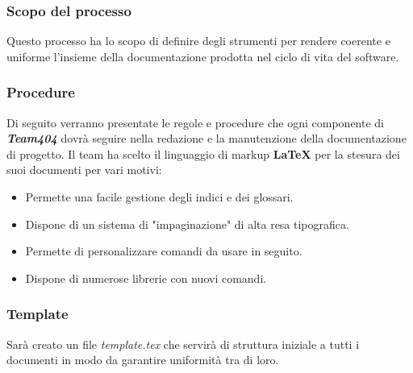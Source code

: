 \documentclass[a4paper,11pt]{article}
\begin{document}
			\subsubsection{Scopo del processo}
			Questo processo ha lo scopo di definire degli strumenti per rendere coerente e uniforme l'insieme della documentazione prodotta nel ciclo di vita del software.
			
			\subsubsection{Procedure}
			Di seguito verranno presentate le regole e procedure che ogni componente di \textbf{\emph{Team404}} dovrà seguire nella redazione e la manutenzione  della documentazione di progetto. Il team ha scelto il linguaggio di markup \textbf{\LaTeX} per la  stesura dei suoi documenti per vari motivi:
			\begin{itemize}
			\item Permette una facile gestione degli indici e dei glossari.
			\item Dispone di  un sistema di "impaginazione" di alta resa tipografica.
			\item Permette di personalizzare comandi da usare in seguito.
			\item Dispone di numerose librerie con nuovi comandi.
	\end{itemize}		 
			\subsubsection{Template}
			Sarà creato un file \textit{template.tex}  che servirà di struttura iniziale a tutti i documenti in modo da garantire uniformità tra di loro.
\end{document}

